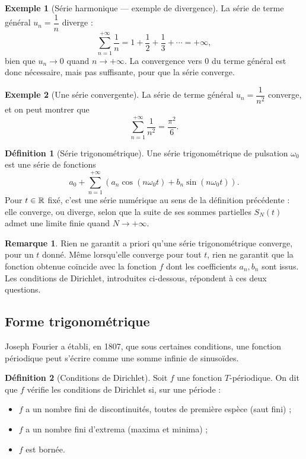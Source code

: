 \documentclass[a4paper,11pt]{article}
\theoremstyle{definition}
\newtheorem{definition}{Définition}[section]
\newtheorem{exemple}{Exemple}[section]
\newtheorem{remark}{Remarque}[section]
\begin{document}
\begin{exemple}[Série harmonique --- exemple de divergence]
    La série de terme général $u_n = \dfrac{1}{n}$ diverge :
    $$
        \sum_{n=1}^{+\infty} \frac{1}{n} = 1 + \frac12 + \frac13 + \cdots = +\infty,
    $$
    bien que $u_n \to 0$ quand $n\to+\infty$. La convergence vers $0$ du terme général est donc nécessaire, mais pas suffisante, pour que la série converge.
\end{exemple}

\begin{exemple}[Une série convergente]
    La série de terme général $u_n = \dfrac{1}{n^2}$ converge, et on peut montrer que
    $$
        \sum_{n=1}^{+\infty} \frac{1}{n^2} = \frac{\pi^2}{6}.
    $$
\end{exemple}

\begin{definition}[Série trigonométrique]
    Une série trigonométrique de pulsation $\omega_0$ est une série de fonctions
    $$
        a_0 + \sum_{n=1}^{+\infty} \left(a_n\cos(n\omega_0 t) + b_n\sin(n\omega_0 t)\right).
    $$
    Pour $t\in{\mathbb{R}}$ fixé, c'est une série numérique au sens de la définition précédente : elle converge, ou diverge, selon que la suite de ses sommes partielles $S_N(t)$ admet une limite finie quand $N\to+\infty$.
\end{definition}

\begin{remark}
    Rien ne garantit a priori qu'une série trigonométrique converge, pour un $t$ donné. Même lorsqu'elle converge pour tout $t$, rien ne garantit que la fonction obtenue coïncide avec la fonction $f$ dont les coefficients $a_n,b_n$ sont issus. Les conditions de Dirichlet, introduites ci-dessous, répondent à ces deux questions.
\end{remark}


\subsection{Forme trigonométrique}

Joseph Fourier a établi, en 1807, que sous certaines conditions, une fonction périodique peut s'écrire comme une somme infinie de sinusoïdes.

\begin{definition}[Conditions de Dirichlet]
    Soit $f$ une fonction $T$-périodique. On dit que $f$ vérifie les conditions de Dirichlet si, sur une période :
    \begin{itemize}
        \item $f$ a un nombre fini de discontinuités, toutes de première espèce (saut fini) ;
        \item $f$ a un nombre fini d'extrema (maxima et minima) ;
        \item $f$ est bornée.
    \end{itemize}
\end{definition}
\end{document}
